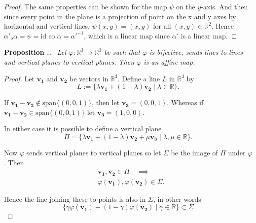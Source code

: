 \documentclass[honours]{UNSWthesis}
\newcommand{\R}{\mathbb{R}}
\newcommand{\1}{\mathbf{e}_{1}}
\newcommand{\2}{\mathbf{e}_{3}}
\newcommand{\3}{\mathbf{e}_{3}}
\newcounter{Item}[section]
\newenvironment{Proposition}{\medskip
                            \refstepcounter{Item}
                            \noindent
                           {\bf Proposition \thesection.\theItem.}\ %
                            \begingroup \sl}
                           {\endgroup\medskip}
\begin{document}
\begin{proof}
The same properties can be shown for the map $\psi$ on the $y$-axis. And then since every point in the plane is a projection of point on the x and y axes by horizontal and vertical lines, $\psi(x,y)=(x,y)$ for all $(x,y) \in \R^{2}$. Hence $\alpha'_{o}\alpha=\psi=\text{id}$ so $\alpha=\alpha'^{-1}$, which is a linear map since $\alpha'$ is a linear map. 
\end{proof}

\begin{Proposition}\label{linesplanes}
Let $\varphi: \R^{3} \longrightarrow \R^{3}$ be such that $\varphi$ is bijective, sends lines to lines and vertical planes to vertical planes. Then $\varphi$ is an affine map. 
\end{Proposition}  

\begin{proof}
Let $\mathbf{v_{1}}$ and $\mathbf{v_{2}} $ be vectors in $\R^{3}$.
Define a line $L$ in $\R^{3}$ by 
$$ L:=\{ \lambda \mathbf{v_{1}} + (1-\lambda) \mathbf{v_{2}} \mid \lambda \in \R \}.$$

If $\mathbf{v_{1}}-\mathbf{v_{2}} \notin \text{span} \{ (0,0,1) \}$, then let $\mathbf{v_{3}}=(0,0,1)$. Whereas if $\mathbf{v_{1}}-\mathbf{v_{2}} \in \text{span} \{ (0,0,1) \}$ let $\mathbf{v_{3}}=(1,0,0)$. 
  
In either case it is possible to define a vertical plane 
$$\Pi=\{ \lambda \mathbf{v_{1}} + (1-\lambda) \mathbf{v_{2}} + \mu\mathbf{v_{3}} \mid \lambda,\mu \in \R \}.$$ 

Now $\varphi$ sends vertical planes to vertical planes so let $\Sigma$ be the image of $\Pi$ under $\varphi$. Then 
\begin{align*}
&\mathbf{v_{1}}, \mathbf{v_{2}} \in \Pi  \quad  \implies\\
&\varphi(\mathbf{v_{1}}),\varphi(\mathbf{v_{2}}) \in \Sigma.
\end{align*}

Hence the line joining these to points is also in $\Sigma$, in other words
\[
\{ \gamma \varphi(\mathbf{v_{1}}) + (1-\gamma)\varphi(\mathbf{v_{2}}) \mid \gamma \in \R \} \subset \Sigma
\]


\end{proof}
\end{document}
